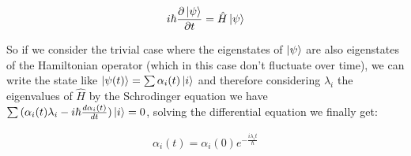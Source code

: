 \documentclass[
  journal=largetwo,
  year=2023,
]{cup-journal}
\begin{document}
\begin{equation}
  \begin{aligned}\label{eq:1}
    i\hbar\frac{\partial \ket{\psi}}{\partial t} = \hat{H}\ket{\psi}
  \end{aligned}
\end{equation}

So if we consider the trivial case where the eigenstates of \(\ket{\psi}\) are also eigenstates of the Hamiltonian operator (which in this case don't fluctuate over time), we can write the state like \(\ket{\psi(t)} = \sum{\alpha_i(t)\ket{i}}\) and therefore considering \(\lambda_i\) the eigenvalues of \(\hat{H}\)  by the Schrodinger equation we have \(\sum{(\alpha_i(t)\lambda_i - i\hbar\frac{d\alpha_i(t)}{dt})\ket{i}} = 0\), solving the differential equation we finally get:

\begin{equation}
  \begin{aligned}\label{eq:2}
    \alpha_i(t) = \alpha_i(0)e^{-\frac{i\lambda_i t}{\hbar}}
  \end{aligned}
\end{equation}
\end{document}
